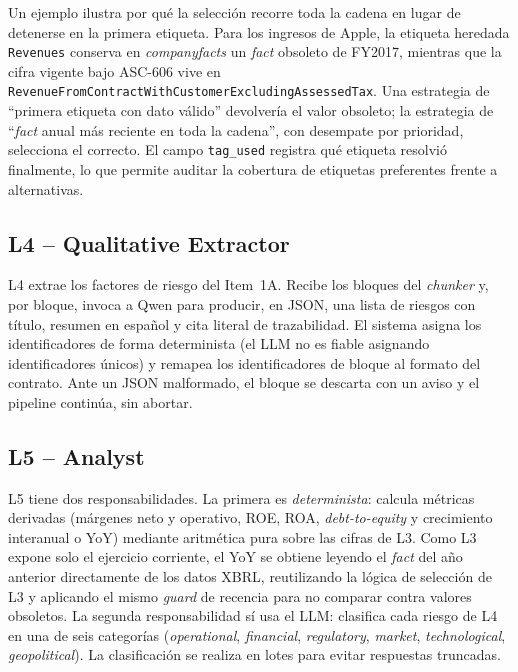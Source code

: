 \documentclass[conference]{IEEEtran}
\begin{document}
Un ejemplo ilustra por qué la selección recorre toda la cadena en lugar de
detenerse en la primera etiqueta. Para los ingresos de Apple, la etiqueta
heredada \texttt{Revenues} conserva en \textit{companyfacts} un \textit{fact}
obsoleto de FY2017, mientras que la cifra vigente bajo ASC-606 vive en
\texttt{RevenueFromContract\-\allowbreak WithCustomer\-\allowbreak ExcludingAssessedTax}.
Una estrategia de
``primera etiqueta con dato válido'' devolvería el valor obsoleto; la estrategia
de ``\textit{fact} anual más reciente en toda la cadena'', con desempate por
prioridad, selecciona el correcto. El campo \texttt{tag\_used} registra qué
etiqueta resolvió finalmente, lo que permite auditar la cobertura de etiquetas
preferentes frente a alternativas.

\subsection{L4 -- Qualitative Extractor}
L4 extrae los factores de riesgo del Item~1A. Recibe los bloques del
\textit{chunker} y, por bloque, invoca a Qwen para producir, en JSON, una lista
de riesgos con título, resumen en español y cita literal de trazabilidad. El
sistema asigna los identificadores de forma determinista (el LLM no es fiable
asignando identificadores únicos) y remapea los identificadores de bloque al
formato del contrato. Ante un JSON malformado, el bloque se descarta con un aviso
y el pipeline continúa, sin abortar.

\subsection{L5 -- Analyst}
L5 tiene dos responsabilidades. La primera es \emph{determinista}: calcula
métricas derivadas (márgenes neto y operativo, ROE, ROA, \textit{debt-to-equity}
y crecimiento interanual o YoY) mediante aritmética pura sobre las cifras de L3.
Como L3 expone solo el ejercicio corriente, el YoY se obtiene leyendo el
\textit{fact} del año anterior directamente de los datos XBRL, reutilizando la
lógica de selección de L3 y aplicando el mismo \textit{guard} de recencia para
no comparar contra valores obsoletos. La segunda responsabilidad sí usa el LLM:
clasifica cada riesgo de L4 en una de seis categorías
(\textit{operational}, \textit{financial}, \textit{regulatory}, \textit{market},
\textit{technological}, \textit{geopolitical}). La clasificación se realiza en
lotes para evitar respuestas truncadas.
\end{document}
